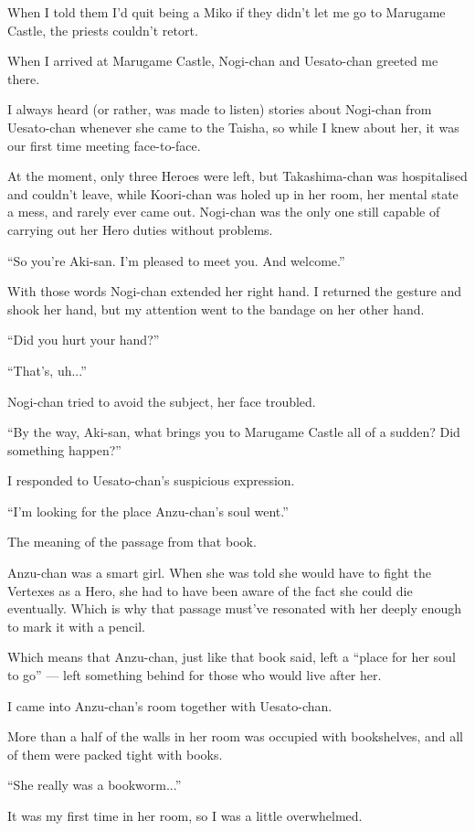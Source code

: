 When I told them I'd quit being a Miko if they didn't let me go to Marugame Castle, the priests couldn't retort.

When I arrived at Marugame Castle, Nogi-chan and Uesato-chan greeted me there.

I always heard (or rather, was made to listen) stories about Nogi-chan from Uesato-chan whenever she came to the Taisha, so while I knew about her, it was our first time meeting face-to-face.

At the moment, only three Heroes were left, but Takashima-chan was hospitalised and couldn't leave, while Koori-chan was holed up in her room, her mental state a mess, and rarely ever came out. Nogi-chan was the only one still capable of carrying out her Hero duties without problems.

``So you're Aki-san. I'm pleased to meet you. And welcome.''

With those words Nogi-chan extended her right hand. I returned the gesture and shook her hand, but my attention went to the bandage on her other hand.

``Did you hurt your hand?''

``That's, uh...''

Nogi-chan tried to avoid the subject, her face troubled.

``By the way, Aki-san, what brings you to Marugame Castle all of a sudden? Did something happen?''

I responded to Uesato-chan's suspicious expression.

``I'm looking for the place Anzu-chan's soul went.''

The meaning of the passage from that book.

Anzu-chan was a smart girl. When she was told she would have to fight the Vertexes as a Hero, she had to have been aware of the fact she could die eventually. Which is why that passage must've resonated with her deeply enough to mark it with a pencil.

Which means that Anzu-chan, just like that book said, left a ``place for her soul to go'' --- left something behind for those who would live after her.

I came into Anzu-chan's room together with Uesato-chan.

More than a half of the walls in her room was occupied with bookshelves, and all of them were packed tight with books.

``She really was a bookworm...''

It was my first time in her room, so I was a little overwhelmed.

